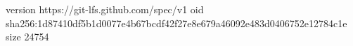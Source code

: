 version https://git-lfs.github.com/spec/v1
oid sha256:1d87410df5b1d0077e4b67bcdf42f27e8e679a46092e483d0406752e12784c1e
size 24754
